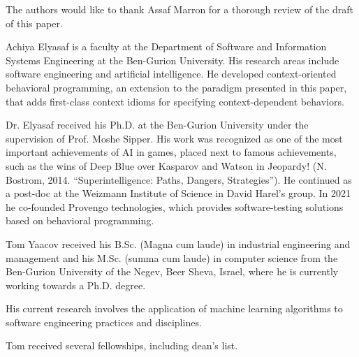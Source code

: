 \documentclass[10pt,journal,compsoc]{IEEEtran}
\theoremstyle{definition}
\begin{document}
The authors would like to thank Assaf Marron for a thorough review of the draft of this paper. 

\ifCLASSOPTIONcaptionsoff
  \newpage
\fi


%


% 

\begin{IEEEbiography}{Achiya Elyasaf} is a faculty at the Department of Software and Information Systems Engineering at the Ben-Gurion University. His research areas include software engineering and artificial intelligence. He developed context-oriented behavioral programming, an extension to the paradigm presented in this paper, that adds first-class context idioms for specifying context-dependent behaviors. 

Dr. Elyasaf received his Ph.D. at the Ben-Gurion University under the supervision of Prof. Moshe Sipper. His work was recognized as one of the most important achievements of AI in games, placed next to famous achievements, such as the wins of Deep Blue over Kasparov and Watson in Jeopardy! (N. Bostrom, 2014. ``Superintelligence: Paths, Dangers, Strategies''). He continued as a post-doc at the Weizmann Institute of Science in David Harel's group. In 2021 he co-founded Provengo technologies, which provides software-testing solutions based on behavioral programming.
\end{IEEEbiography}

\begin{IEEEbiography}{Tom Yaacov}
received his B.Sc. (Magna cum laude) in industrial engineering and management and his M.Sc. (summa cum laude) in computer science from the Ben-Gurion University of the Negev, Beer Sheva, Israel, where he is currently working towards a Ph.D. degree.

His current research involves the application of machine learning algorithms to software engineering practices and disciplines.

Tom received several fellowships, including dean's list.
\end{IEEEbiography}
\end{document}
